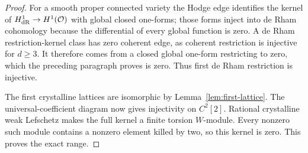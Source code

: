 \begin{proof}
For a smooth proper connected variety the Hodge edge identifies the kernel of $H^1_{\mathrm{dR}}\to H^1(\mathcal O)$ with global closed one-forms; those forms inject into de Rham cohomology because the differential of every global function is zero. A de Rham restriction-kernel class has zero coherent edge, as coherent restriction is injective for $d\ge3$. It therefore comes from a closed global one-form restricting to zero, which the preceding paragraph proves is zero. Thus first de Rham restriction is injective.

The first crystalline lattices are isomorphic by Lemma~\ref{lem:first-lattice}. The universal-coefficient diagram now gives injectivity on $C^2[2]$. Rational crystalline weak Lefschetz makes the full kernel a finite torsion $W$-module. Every nonzero such module contains a nonzero element killed by two, so this kernel is zero. This proves the exact range.
\end{proof}
